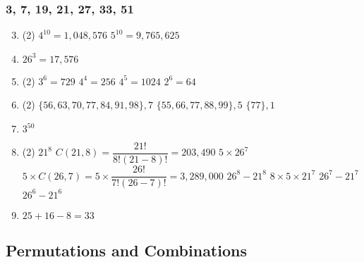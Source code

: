 \documentclass[12pt, A4]{article}
\begin{document}
			\subsubsection*{3, 7, 19, 21, 27, 33, 51}
				\begin{enumerate}
					\setcounter{enumi}{2}
					\item
						\begin{tasks}(2)
							\task
								\(4^10 = 1,048,576\)
							\task
								\(5^{10} = 9,765,625\)
						\end{tasks}
					\setcounter{enumi}{6}
					\item
						\(26^3 = 17,576\)	
					\setcounter{enumi}{18}
					\item
						\begin{tasks}(2)
							\task
								\(3^6 = 729\)
							\task
								\(4^4 = 256\)
							\task
								\(4^5 = 1024\)
							\task
								\(2^6 = 64\)
						\end{tasks}
					\setcounter{enumi}{20}
					\item
						\begin{tasks}(2)
							\task
								\(\{56, 63, 70, 77, 84, 91, 98\}, 7\)
							\task
								\(\{55, 66, 77, 88, 99\}, 5\)
							\task
								\(\{77\}, 1\)
						\end{tasks}
					\setcounter{enumi}{26}
					\item
						\(3^{50}\)
					\setcounter{enumi}{32}
					\item
						\begin{tasks}(2)
							\task
								\(21^8\)
							\task
								\(C(21, 8) = \dfrac{21!}{8!(21 - 8)!} = 203,490\)
							\task
								\(5 \times 26^7\)
							\task
								\(5 \times C(26, 7) = 5 \times \dfrac{26!}{7!(26 - 7)!} = 3,289,000\)
							\task
								\(26^8 - 21^8\)
							\task
								\(8 \times 5 \times 21^7\)
							\task
								\(26^7 - 21^7\)
							\task
								\(26^6 - 21^6\)
						\end{tasks}
					\setcounter{enumi}{54}
					\item
						\(25 + 16 - 8 = 33\)
				\end{enumerate}
		\setcounter{subsection}{2}
		\subsection{Permutations and Combinations}
\end{document}
